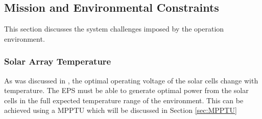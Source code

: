 \subsection{Mission and Environmental Constraints}
\label{subsec:environmental_requirements}
This section discusses the system challenges imposed by the operation environment.

\subsubsection*{Solar Array Temperature}
As was discussed in \cite{PDR}, the optimal operating voltage of the solar cells change with temperature. The \ac{EPS} must be able to generate optimal power from the solar cells in the full expected temperature range of the environment. This can be achieved using a \ac{MPPTU} which will be discussed in Section \ref{sec:MPPTU}

